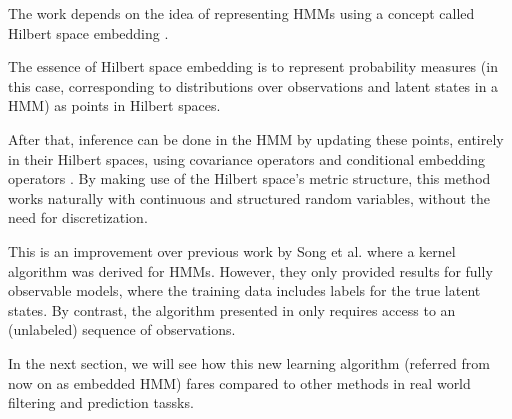 The work depends on the idea of representing HMMs using a 
concept called Hilbert space embedding \cite{ref21} \cite{ref22}. 

The essence of Hilbert space embedding is to represent probability measures (in this case, corresponding to distributions over observations and latent states in a HMM) as points in Hilbert spaces. 

After that, inference can be done in the HMM by updating these points, entirely in their Hilbert spaces, using covariance operators \cite{ref23} and conditional
embedding operators \cite{ref24}. By making use of the Hilbert space’s metric structure, this method works naturally with continuous and structured
random variables, without the need for discretization.

This is an improvement over previous work by Song et al.\cite{ref24} where a kernel algorithm was derived for HMMs. However, they only provided results for fully observable models, where the training data includes labels
for the true latent states. By contrast, the algorithm presented in \cite{ref20} only requires access to an (unlabeled) sequence of observations.

In the next section, we will see how this new learning algorithm (referred from now on as embedded HMM) fares compared to other methods in real world filtering and prediction tassks.